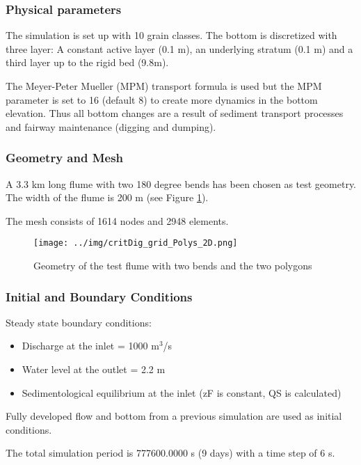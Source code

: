 \subsubsection{Physical parameters}
%
The simulation is set up with 10 grain classes. 
The bottom is discretized with three layer: A constant active layer (0.1 m), an underlying stratum (0.1 m) and a third layer up to the rigid bed (9.8m).  

The Meyer-Peter Mueller (MPM) transport formula is used but the MPM parameter is set to 16 (default 8) to create more dynamics in the bottom elevation. Thus all bottom changes are a result of sediment transport processes and fairway maintenance (digging and dumping).  
%
%
\subsubsection{Geometry and Mesh}
%
A 3.3 km long flume with two 180 degree bends has been chosen as test geometry.
The width of the flume is 200 m  (see Figure \ref{grid}). 

The mesh consists of 1614 nodes and 2948 elements.

\begin{figure} [!h]
\centering
\texttt{[image: ../img/critDig\_grid\_Polys\_2D.png]}
\caption{Geometry of the test flume with two bends and the two polygons}\label{grid}
\end{figure}


%
%
\subsubsection{Initial and Boundary Conditions}
%
Steady state boundary conditions:
\begin{itemize}
\item{ Discharge at the inlet = 1000 m$^3$/s}
\item Water level at the outlet = 2.2 m
\item Sedimentological equilibrium at the inlet (zF is constant, QS is calculated)
\end{itemize}
Fully developed flow and bottom from a previous simulation are used as initial conditions.

The total simulation period is 777600.0000 s (9 days) with a time step of 6 s. 
%
%
